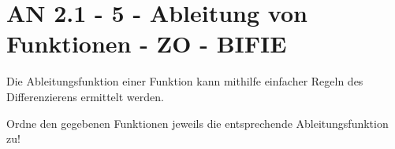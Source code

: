\section{AN 2.1 - 5 - Ableitung von Funktionen - ZO - BIFIE}

\begin{beispiel}[AN 2.1]{1} %
				Die Ableitungsfunktion einer Funktion kann mithilfe einfacher Regeln des Differenzierens ermittelt werden.

Ordne den gegebenen Funktionen jeweils die entsprechende Ableitungsfunktion zu!

\end{beispiel}